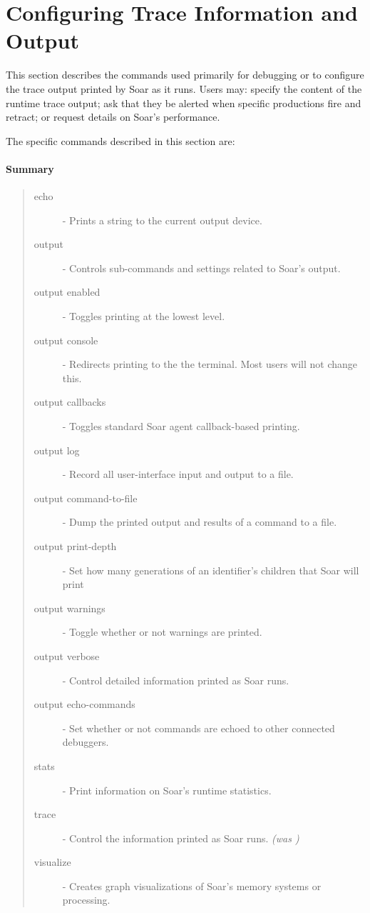 \divider 


\divider 


\divider 


\divider 


\divider 

\section{Configuring Trace Information and Output}
\label{DEBUG}

This section describes the commands used primarily for debugging or
to configure the trace output printed by Soar as it runs.  Users may:
specify the content of the runtime trace output; ask that
they be alerted when specific productions fire and retract; 
or request details on Soar's performance.

The specific commands described in this section are:


\paragraph{Summary}
\begin{quote}
\begin{description}
\item[echo] - Prints a string to the current output device.
\item[output] - Controls sub-commands and settings related to Soar's output.
\item[output enabled] - Toggles printing at the lowest level.
\item[output console] - Redirects printing to the the terminal.  Most users will not change this.
\item[output callbacks] - Toggles standard Soar agent callback-based printing.
\item[output log] - Record all user-interface input and output to a file. 
\item[output command-to-file] - Dump the printed output and results of a command to a file.
\item[output print-depth] - Set how many generations of an identifier's children that Soar will print
\item[output warnings] - Toggle whether or not warnings are printed.
\item[output verbose] - Control detailed information printed as Soar runs.
\item[output echo-commands] - Set whether or not commands are echoed to other connected debuggers. 
\item[stats] - Print information on Soar's runtime statistics.
\item[trace] - Control the information printed as Soar runs. \emph{(was )}
\item[visualize] - Creates graph visualizations of Soar's memory systems or processing.
\end{description}
\end{quote}

